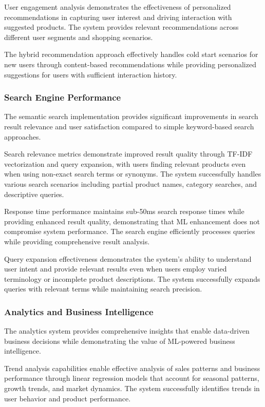 \documentclass[12pt]{article}
\begin{document}
User engagement analysis demonstrates the effectiveness of personalized recommendations in capturing user interest and driving interaction with suggested products. The system provides relevant recommendations across different user segments and shopping scenarios.

The hybrid recommendation approach effectively handles cold start scenarios for new users through content-based recommendations while providing personalized suggestions for users with sufficient interaction history.

\subsubsection{Search Engine Performance}
The semantic search implementation provides significant improvements in search result relevance and user satisfaction compared to simple keyword-based search approaches.

Search relevance metrics demonstrate improved result quality through TF-IDF vectorization and query expansion, with users finding relevant products even when using non-exact search terms or synonyms. The system successfully handles various search scenarios including partial product names, category searches, and descriptive queries.

Response time performance maintains sub-50ms search response times while providing enhanced result quality, demonstrating that ML enhancement does not compromise system performance. The search engine efficiently processes queries while providing comprehensive result analysis.

Query expansion effectiveness demonstrates the system's ability to understand user intent and provide relevant results even when users employ varied terminology or incomplete product descriptions. The system successfully expands queries with relevant terms while maintaining search precision.

\subsubsection{Analytics and Business Intelligence}
The analytics system provides comprehensive insights that enable data-driven business decisions while demonstrating the value of ML-powered business intelligence.

Trend analysis capabilities enable effective analysis of sales patterns and business performance through linear regression models that account for seasonal patterns, growth trends, and market dynamics. The system successfully identifies trends in user behavior and product performance.
\end{document}
